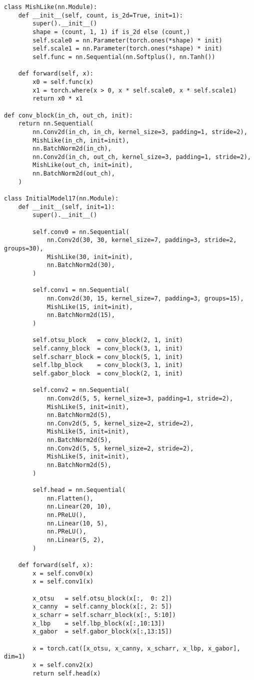 \documentclass{article}
\begin{document}
\begin{verbatim}
class MishLike(nn.Module):
    def __init__(self, count, is_2d=True, init=1):
        super().__init__()
        shape = (count, 1, 1) if is_2d else (count,)
        self.scale0 = nn.Parameter(torch.ones(*shape) * init)
        self.scale1 = nn.Parameter(torch.ones(*shape) * init)
        self.func = nn.Sequential(nn.Softplus(), nn.Tanh())

    def forward(self, x):
        x0 = self.func(x)
        x1 = torch.where(x > 0, x * self.scale0, x * self.scale1)
        return x0 * x1

def conv_block(in_ch, out_ch, init):
    return nn.Sequential(
        nn.Conv2d(in_ch, in_ch, kernel_size=3, padding=1, stride=2),
        MishLike(in_ch, init=init),
        nn.BatchNorm2d(in_ch),
        nn.Conv2d(in_ch, out_ch, kernel_size=3, padding=1, stride=2),
        MishLike(out_ch, init=init),
        nn.BatchNorm2d(out_ch),
    )

class InitialModel17(nn.Module):
    def __init__(self, init=1):
        super().__init__()

        self.conv0 = nn.Sequential(
            nn.Conv2d(30, 30, kernel_size=7, padding=3, stride=2, groups=30),
            MishLike(30, init=init),
            nn.BatchNorm2d(30),
        )

        self.conv1 = nn.Sequential(
            nn.Conv2d(30, 15, kernel_size=7, padding=3, groups=15),
            MishLike(15, init=init),
            nn.BatchNorm2d(15),
        )

        self.otsu_block   = conv_block(2, 1, init)
        self.canny_block  = conv_block(3, 1, init)
        self.scharr_block = conv_block(5, 1, init)
        self.lbp_block    = conv_block(3, 1, init)
        self.gabor_block  = conv_block(2, 1, init)

        self.conv2 = nn.Sequential(
            nn.Conv2d(5, 5, kernel_size=3, padding=1, stride=2),
            MishLike(5, init=init),
            nn.BatchNorm2d(5),
            nn.Conv2d(5, 5, kernel_size=2, stride=2),
            MishLike(5, init=init),
            nn.BatchNorm2d(5),
            nn.Conv2d(5, 5, kernel_size=2, stride=2),
            MishLike(5, init=init),
            nn.BatchNorm2d(5),
        )

        self.head = nn.Sequential(
            nn.Flatten(),
            nn.Linear(20, 10),
            nn.PReLU(),
            nn.Linear(10, 5),
            nn.PReLU(),
            nn.Linear(5, 2),
        )

    def forward(self, x):
        x = self.conv0(x)
        x = self.conv1(x)

        x_otsu   = self.otsu_block(x[:,  0: 2])
        x_canny  = self.canny_block(x[:, 2: 5])
        x_scharr = self.scharr_block(x[:, 5:10])
        x_lbp    = self.lbp_block(x[:,10:13])
        x_gabor  = self.gabor_block(x[:,13:15])

        x = torch.cat([x_otsu, x_canny, x_scharr, x_lbp, x_gabor], dim=1)
        x = self.conv2(x)
        return self.head(x)
\end{verbatim}
\end{document}
